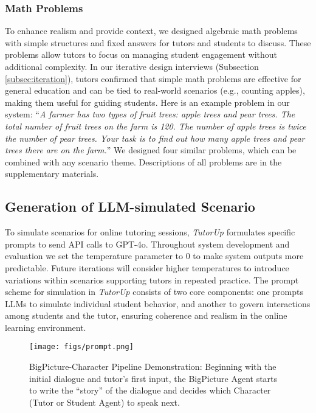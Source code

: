\subsubsection{Math Problems}
To enhance realism and provide context, we designed algebraic math problems with simple structures and fixed answers for tutors and students to discuss. These problems allow tutors to focus on managing student engagement without additional complexity. In our iterative design interviews (Subsection \ref{subsec:iteration}), tutors confirmed that simple math problems are effective for general education and can be tied to real-world scenarios (e.g., counting apples), making them useful for guiding students.  Here is an example problem in our system: ``\textit{A farmer has two types of fruit trees: apple trees and pear trees. The total number of fruit trees on the farm is 120. The number of apple trees is twice the number of pear trees. Your task is to find out how many apple trees and pear trees there are on the farm.}'' We designed four similar problems, which can be combined with any scenario theme. Descriptions of all problems are in the supplementary materials.

\subsection{Generation of LLM-simulated Scenario}
To simulate scenarios for online tutoring sessions, \textit{TutorUp} formulates specific prompts to send API calls to GPT-4o. Throughout system development and evaluation we set the temperature parameter to $0$ to make system outputs more predictable. Future iterations will consider higher temperatures to introduce variations within scenarios supporting tutors in repeated practice. The prompt scheme for simulation in \textit{TutorUp} consists of two core components: one prompts LLMs to simulate individual student behavior, and another to govern interactions among students and the tutor, ensuring coherence and realism in the online learning environment.


\begin{figure*}
    \centering
    \texttt{[image: figs/prompt.png]}
\caption{BigPicture-Character Pipeline Demonstration: Beginning with the initial dialogue and tutor's first input, the BigPicture Agent starts to write the ``story'' of the dialogue and decides which Character (Tutor or Student Agent) to speak next.}
    \label{fig:promptPipeline}
\end{figure*}


